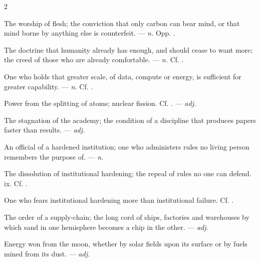 \begin{multicols}{2}

 The worship of flesh; the conviction that only carbon can bear mind, or that mind borne by anything else is counterfeit. —  \textit{n.} Opp. .

 The doctrine that humanity already has enough, and should cease to want more; the creed of those who are already comfortable. —  \textit{n.} Cf. .

 One who holds that greater scale, of data, compute or energy, is sufficient for greater capability. —  \textit{n.} Cf. .

 Power from the splitting of atoms; nuclear fission. Cf. . —  \textit{adj.}

 The stagnation of the academy; the condition of a discipline that produces papers faster than results. —  \textit{adj.}

 An official of a hardened institution; one who administers rules no living person remembers the purpose of. —  \textit{n.}

 The dissolution of institutional hardening; the repeal of rules no one can defend.   ix. Cf. .

 One who fears institutional hardening more than institutional failure. Cf. .

 The order of a supply-chain; the long cord of ships, factories and warehouses by which sand in one hemisphere becomes a chip in the other. —  \textit{adj.}

 Energy won from the moon, whether by solar fields upon its surface or by fuels mined from its dust. —  \textit{adj.}


\end{multicols}
